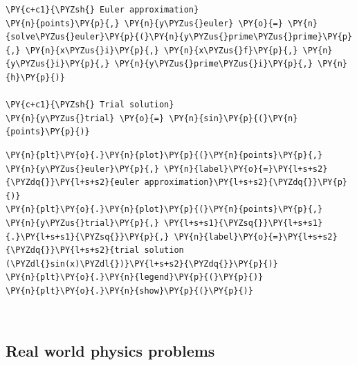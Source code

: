     \begin{tcolorbox}[breakable, size=fbox, boxrule=1pt, pad at break*=1mm,colback=cellbackground, colframe=cellborder]
\begin{Verbatim}[commandchars=\\\{\}]
\PY{c+c1}{\PYZsh{} Euler approximation}
\PY{n}{points}\PY{p}{,} \PY{n}{y\PYZus{}euler} \PY{o}{=} \PY{n}{solve\PYZus{}euler}\PY{p}{(}\PY{n}{y\PYZus{}prime\PYZus{}prime}\PY{p}{,} \PY{n}{x\PYZus{}i}\PY{p}{,} \PY{n}{x\PYZus{}f}\PY{p}{,} \PY{n}{y\PYZus{}i}\PY{p}{,} \PY{n}{y\PYZus{}prime\PYZus{}i}\PY{p}{,} \PY{n}{h}\PY{p}{)}

\PY{c+c1}{\PYZsh{} Trial solution}
\PY{n}{y\PYZus{}trial} \PY{o}{=} \PY{n}{sin}\PY{p}{(}\PY{n}{points}\PY{p}{)}
\end{Verbatim}
\end{tcolorbox}

    \begin{tcolorbox}[breakable, size=fbox, boxrule=1pt, pad at break*=1mm,colback=cellbackground, colframe=cellborder]
\begin{Verbatim}[commandchars=\\\{\}]
\PY{n}{plt}\PY{o}{.}\PY{n}{plot}\PY{p}{(}\PY{n}{points}\PY{p}{,} \PY{n}{y\PYZus{}euler}\PY{p}{,} \PY{n}{label}\PY{o}{=}\PY{l+s+s2}{\PYZdq{}}\PY{l+s+s2}{euler approximation}\PY{l+s+s2}{\PYZdq{}}\PY{p}{)}
\PY{n}{plt}\PY{o}{.}\PY{n}{plot}\PY{p}{(}\PY{n}{points}\PY{p}{,} \PY{n}{y\PYZus{}trial}\PY{p}{,} \PY{l+s+s1}{\PYZsq{}}\PY{l+s+s1}{.}\PY{l+s+s1}{\PYZsq{}}\PY{p}{,} \PY{n}{label}\PY{o}{=}\PY{l+s+s2}{\PYZdq{}}\PY{l+s+s2}{trial solution (\PYZdl{}sin(x)\PYZdl{})}\PY{l+s+s2}{\PYZdq{}}\PY{p}{)}
\PY{n}{plt}\PY{o}{.}\PY{n}{legend}\PY{p}{(}\PY{p}{)}
\PY{n}{plt}\PY{o}{.}\PY{n}{show}\PY{p}{(}\PY{p}{)}
\end{Verbatim}
\end{tcolorbox}

    \begin{center}
    \end{center}
    { \hspace*{\fill} \\}
    
    \hypertarget{real-world-physics-problems}{%
\subsection{Real world physics
problems}\label{real-world-physics-problems}}

